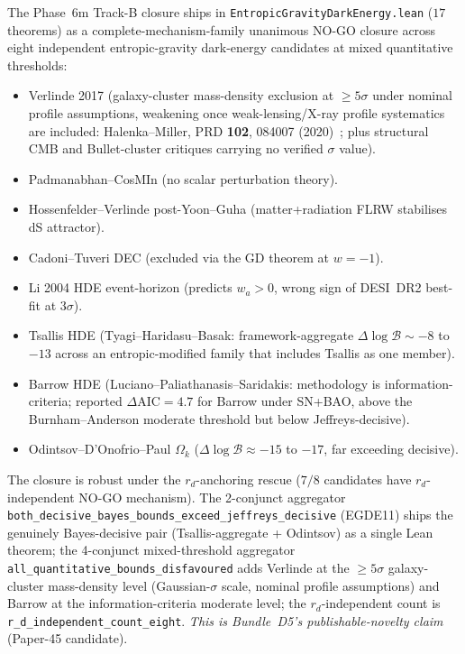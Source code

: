 \documentclass[aps,prd,reprint,nofootinbib,superscriptaddress]{revtex4-2}
\begin{document}
The Phase~6m Track-B closure ships in
\texttt{EntropicGravityDarkEnergy.lean} ($17$ theorems) as a
complete-mechanism-family unanimous NO-GO closure across eight
independent entropic-gravity dark-energy candidates at mixed
quantitative thresholds:

\begin{itemize}
\item Verlinde 2017 (galaxy-cluster mass-density exclusion at
  $\geq 5\sigma$ under nominal profile assumptions, weakening once
  weak-lensing/X-ray profile systematics are included:
  Halenka--Miller, PRD \textbf{102}, 084007
  (2020)~\cite{HalenkaMiller2020}; plus structural
  CMB and Bullet-cluster critiques carrying no verified $\sigma$
  value).
\item Padmanabhan--CosMIn (no scalar perturbation theory).
\item Hossenfelder--Verlinde post-Yoon--Guha (matter+radiation
  FLRW stabilises dS attractor).
\item Cadoni--Tuveri DEC (excluded via the GD theorem at $w = -1$).
\item Li 2004 HDE event-horizon (predicts $w_a > 0$, wrong sign of
  DESI~DR2 best-fit at $3\sigma$).
\item Tsallis HDE (Tyagi--Haridasu--Basak: framework-aggregate
  $\Delta\!\log\mathcal{B} \sim -8$ to $-13$ across an
  entropic-modified family that includes Tsallis as one member).
\item Barrow HDE (Luciano--Paliathanasis--Saridakis: methodology is
  information-criteria; reported $\Delta\!\mathrm{AIC} = 4.7$ for
  Barrow under SN+BAO, above the Burnham--Anderson moderate
  threshold but below Jeffreys-decisive).
\item Odintsov--D'Onofrio--Paul $\Omega_k$
  ($\Delta\!\log\mathcal{B} \approx -15$ to $-17$, far exceeding
  decisive).
\end{itemize}

\noindent
The closure is robust under the $r_d$-anchoring rescue ($7/8$
candidates have $r_d$-independent NO-GO mechanism). The
2-conjunct aggregator
\texttt{both\_decisive\_bayes\_bounds\_exceed\_jeffreys\_decisive}
(EGDE11) ships the genuinely Bayes-decisive pair
(Tsallis-aggregate + Odintsov) as a single Lean theorem;
the 4-conjunct mixed-threshold aggregator
\texttt{all\_quantitative\_bounds\_disfavoured} adds Verlinde at the
$\geq 5\sigma$ galaxy-cluster mass-density level (Gaussian-$\sigma$
scale, nominal profile assumptions) and Barrow at the
information-criteria moderate level; the $r_d$-independent count is
\texttt{r\_d\_independent\_count\_eight}. \emph{This is Bundle~D5's
publishable-novelty claim} (Paper-45 candidate).
\end{document}
